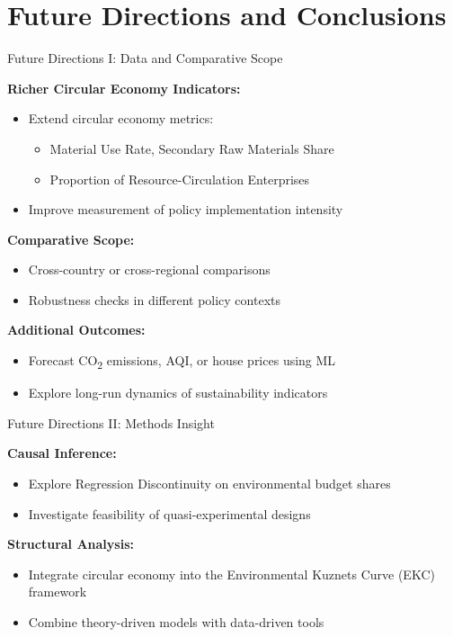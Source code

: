 \documentclass{beamer}
\begin{document}
\section{Future Directions and Conclusions}
\begin{frame}{Future Directions I: Data and Comparative Scope}
\small

\textbf{Richer Circular Economy Indicators:}
\begin{itemize}
    \item Extend circular economy metrics:
    \begin{itemize}
        \item Material Use Rate, Secondary Raw Materials Share
        \item Proportion of Resource-Circulation Enterprises
    \end{itemize}
    \item Improve measurement of policy implementation intensity
\end{itemize}

\vspace{0.5em}
\textbf{Comparative Scope:}
\begin{itemize}
    \item Cross-country or cross-regional comparisons
    \item Robustness checks in different policy contexts
\end{itemize}

\vspace{0.5em}
\textbf{Additional Outcomes:}
\begin{itemize}
    \item Forecast CO\textsubscript{2} emissions, AQI, or house prices using ML
    \item Explore long-run dynamics of sustainability indicators
\end{itemize}
\end{frame}

\begin{frame}{Future Directions II: Methods Insight}
\small

\textbf{Causal Inference:}
\begin{itemize}
    \item Explore Regression Discontinuity on environmental budget shares
    \item Investigate feasibility of quasi-experimental designs
\end{itemize}

\vspace{0.5em}
\textbf{Structural Analysis:}
\begin{itemize}
    \item Integrate circular economy into the Environmental Kuznets Curve (EKC) framework
    \item Combine theory-driven models with data-driven tools
\end{itemize}

\end{frame}
\end{document}
